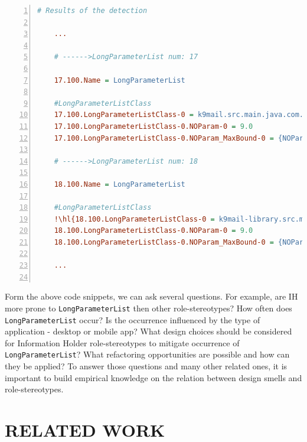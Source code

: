 \documentclass[AMA,Times1COL]{WileyNJDv5} %
\begin{document}
\begin{lstlisting}[language={ini}, mathescape, backgroundcolor=\color{gray!10}, frame=trlb,caption={\footnotesize Example {\tt LongParameterList} design smell detected from K9 Mail project using SAD tool. Line {\tt 19} shows {\tt ImageStoreSettings.java} class\label{lst:dscode}}, numbers=left, escapechar=!,tabsize=2]
	# Results of the detection 
	
	...
	
	# ------>LongParameterList num: 17
	
	17.100.Name = LongParameterList
	
	#LongParameterListClass
	17.100.LongParameterListClass-0 = k9mail.src.main.java.com.fsck.k9.activity.compose.RecipientPresenter
	17.100.LongParameterListClass-0.NOParam-0 = 9.0
	17.100.LongParameterListClass-0.NOParam_MaxBound-0 = {NOParam_MaxBound=6.0}
	
	# ------>LongParameterList num: 18
	
	18.100.Name = LongParameterList
	
	#LongParameterListClass
	!\hl{18.100.LongParameterListClass-0 = k9mail-library.src.main.java.com.fsck.k9.mail.store.imap.ImapStoreSettings}!
	18.100.LongParameterListClass-0.NOParam-0 = 9.0
	18.100.LongParameterListClass-0.NOParam_MaxBound-0 = {NOParam_MaxBound=6.0}
	
	...
	
\end{lstlisting}
Form the above code snippets, we can ask several questions. For example, are IH more prone to {\tt LongParameterList} then other role-stereotypes? How often does {\tt LongParameterList} occur? Is the occurrence influenced by the type of application - desktop or mobile app? What design choices should be considered for Information Holder role-stereotypes to mitigate occurrence of {\tt LongParameterList}? What refactoring opportunities are possible and how can they be applied? To answer those questions and many other related ones, it is important to build empirical knowledge on the relation between design smells and role-stereotypes. 

\section{RELATED WORK}\label{sec:relatedwork}
\end{document}
